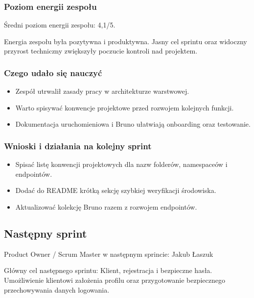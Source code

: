 \documentclass[12pt,a4paper]{article}
\begin{document}
\subsubsection*{Poziom energii zespołu}
Średni poziom energii zespołu: 4,1/5.

Energia zespołu była pozytywna i produktywna. Jasny cel sprintu oraz widoczny przyrost techniczny zwiększyły poczucie kontroli nad projektem.

\subsubsection*{Czego udało się nauczyć}
\begin{itemize}
\item Zespół utrwalił zasady pracy w architekturze warstwowej.
\item Warto spisywać konwencje projektowe przed rozwojem kolejnych funkcji.
\item Dokumentacja uruchomieniowa i Bruno ułatwiają onboarding oraz testowanie.
\end{itemize}
\subsubsection*{Wnioski i działania na kolejny sprint}
\begin{itemize}
\item Spisać listę konwencji projektowych dla nazw folderów, namespaceów i endpointów.
\item Dodać do README krótką sekcję szybkiej weryfikacji środowiska.
\item Aktualizować kolekcję Bruno razem z rozwojem endpointów.
\end{itemize}

\subsection*{Następny sprint}
Product Owner / Scrum Master w następnym sprincie: Jakub Łaszuk

Główny cel następnego sprintu: Klient, rejestracja i bezpieczne hasła. Umożliwienie klientowi założenia profilu oraz przygotowanie bezpiecznego przechowywania danych logowania.
\end{document}
